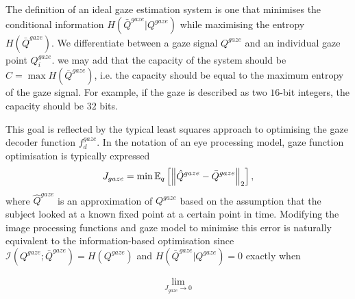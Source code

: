 
The definition of an ideal gaze estimation system is one that minimises the conditional information $H(\bar{Q}^{gaze}|Q^{gaze})$ while maximising the entropy $H(\bar{Q}^{gaze})$. We differentiate between a gaze signal $Q^{gaze}$ and an individual gaze point $Q^{gaze}_i$. we may add that the capacity of the system should be $C = \max H(\bar{Q}^{gaze})$, i.e. the capacity should be equal to the maximum entropy of the gaze signal. For example, if the gaze is described as two $16$-bit integers, the capacity should be $32$ bits. 
 

This goal is reflected by the typical least squares approach to optimising the gaze decoder function $f^{gaze}_d$. In the notation of an eye processing model, gaze function optimisation is typically expressed
\begin{align}
    J_{gaze} = \min \mathbb{E}_{q}\left[\left\lVert\hat{Q}^{gaze} - \bar{Q}^{gaze}\right\rVert_2\right],
\end{align}
where $\hat{Q}^{gaze}$ is an approximation of $Q^{gaze}$ based on the assumption that the subject looked at a known fixed point at a certain point in time. Modifying the image processing functions and gaze model to minimise this error is naturally equivalent to the information-based optimisation since $\mathcal{I}(Q^{gaze};\bar{Q}^{gaze})=H(Q^{gaze})$ and $H(\bar{Q}^{gaze}|Q^{gaze})=0$ exactly when 

\begin{align}
	\lim_{J_{gaze}\rightarrow 0}
\end{align}


